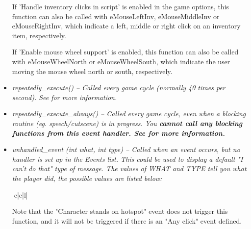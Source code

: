 \begin{itemize}
  If 'Handle inventory clicks in script' is enabled in the game options, this
  function can also be called with eMouseLeftInv, eMouseMiddleInv or eMouseRightInv, which
  indicate a left, middle or right click on an inventory item, respectively.

  If 'Enable mouse wheel support' is enabled, this function can also be called with
  eMouseWheelNorth or eMouseWheelSouth, which indicate the user moving the mouse wheel north or
  south, respectively.
\item \it{repeatedly_execute()} -- Called every game cycle (normally 40 times per second).
  See  for more information.
\item \it{repeatedly_execute_always()} -- Called every game cycle, even when a
  blocking routine (eg. speech/cutscene) is in
  progress. You \bf{cannot} call any blocking functions from this event handler.
  See  for more information.
\item \it{unhandled_event (int what, int type)} -- Called when an event occurs,
  but no handler is set up in the Events list.
  This could be used to display a default "I can't do that" type of message.
  The values of WHAT and TYPE tell you what the player did,
  the possible values are listed below:
  \begin{tabular}{|c|c|l|}
  \end{tabular}
  Note that the "Character stands on hotspot" event does not trigger this
  function, and it will not be triggered if there is an "Any click" event defined.


\end{itemize}
